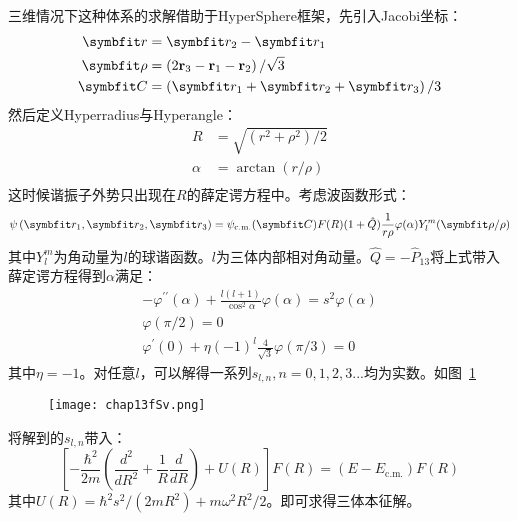 三维情况下这种体系的求解\cite{Fleix2006prlunitary3b}借助于HyperSphere框架，先引入Jacobi坐标：
\begin{equation}
\begin{split}
\Vector{r}&=\Vector{r}_{2}-\Vector{r}_{1}\\
\boldsymbol{\rho}&=\left(2 \mathbf{r}_{3}-\mathbf{r}_{1}-\mathbf{r}_{2}\right) / \sqrt{3}\\
\Vector{C}&=\left(\Vector{r}_{1}+\Vector{r}_{2}+\Vector{r}_{3}\right) / 3\\
\end{split}
\end{equation}
然后定义Hyperradius与Hyperangle：
\begin{equation}
\begin{split}
R&=\sqrt{\left(r^{2}+\rho^{2}\right) / 2}\\
\alpha&=\arctan (r / \rho)\\
\end{split}
\end{equation}
这时候谐振子外势只出现在$R$的薛定谔方程中。考虑波函数形式：
\begin{equation}
\psi\left(\Vector{r}_{1}, \Vector{r}_{2}, \Vector{r}_{3}\right)=\psi_{\mathrm{c} . \mathrm{m} .}(\Vector{C}) F(R)(1+\hat{Q}) \frac{1}{r \rho} \varphi(\alpha) Y_{l}^{m}(\boldsymbol{\rho} / \rho)
\end{equation}
其中$Y_l^m$为角动量为$l$的球谐函数。$l$为三体内部相对角动量。$\hat{Q}=-\hat{P}_{13}$将上式带入薛定谔方程得到$\alpha$满足：
\begin{equation}
\begin{gathered}
-\varphi^{\prime \prime}(\alpha)+\frac{l(l+1)}{\cos ^{2} \alpha} \varphi(\alpha)=s^{2} \varphi(\alpha) \\
\varphi(\pi / 2)=0 \\
\varphi^{\prime}(0)+\eta(-1)^{l} \frac{4}{\sqrt{3}} \varphi(\pi / 3)=0
\end{gathered}
\end{equation}
其中$\eta=-1$。对任意$l$，可以解得一系列$s_{l,n},n=0,1,2,3...$均为实数。如图~\ref{Sv}~
\begin{figure}[!htbp]
    \centering
    \texttt{[image: chap13fSv.png]}
    \label{Sv}
\end{figure}
将解到的$s_{l,n}$带入：
\begin{equation}
\left[-\frac{\hbar^{2}}{2 m}\left(\frac{d^{2}}{d R^{2}}+\frac{1}{R} \frac{d}{d R}\right)+U(R)\right] F(R)=\left(E-E_{\mathrm{c} . \mathrm{m} .}\right) F(R)
\end{equation}
其中$U(R)=\hbar^{2} s^{2} /\left(2 m R^{2}\right)+m \omega^{2} R^{2} / 2$。即可求得三体本征解。

